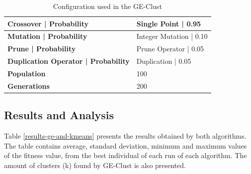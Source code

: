 \documentclass[journal]{IEEEtran}
\begin{document}
	\begin{table}[]
		\centering
		\caption{Configuration used in the GE-Clust}
		\label{ge-configuration}
		\begin{tabular}{|l|l|}
			\hline
			\textbf{Crossover  |  Probability}         & Single Point  | 0.95     \\ \hline
			\textbf{Mutation | Probability}            & Integer Mutation          |  0.10 \\ \hline
			\textbf{Prune  | Probability}      & Prune Operator           | 0.05   \\ \hline
			\textbf{Duplication Operator | Probability} & Duplication   | 0.05     \\ \hline
			\textbf{Population}                        & 100                               \\ \hline
			\textbf{Generations}                       & 200                               \\ \hline
		\end{tabular}
	\end{table}
	

\subsection{Results and Analysis}
	


Table \ref{results-ge-and-kmeans} presents the results obtained by both algorithms. The table contains average, 
 standard deviation, minimum and maximum values of the fitness value,  from the best individual of each run of each algorithm. The amount of clusters (k) found by GE-Clust is also presented.
	
	
\end{document}
